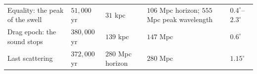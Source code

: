 \documentclass[
  11pt,
]{article}
\begin{document}
\begin{longtable}[]{@{}lllll@{}}
\begin{minipage}[t]{0.17\columnwidth}\raggedright
Equality: the peak of the swell\strut
\end{minipage} & \begin{minipage}[t]{0.17\columnwidth}\raggedright
\(51{,}000\) yr\strut
\end{minipage} & \begin{minipage}[t]{0.17\columnwidth}\raggedright
\(31\) kpc\strut
\end{minipage} & \begin{minipage}[t]{0.17\columnwidth}\raggedright
\(106\) Mpc horizon; \(555\) Mpc peak wavelength\strut
\end{minipage} & \begin{minipage}[t]{0.17\columnwidth}\raggedright
\(0.4^\circ\)--\(2.3^\circ\)\strut
\end{minipage}\tabularnewline
\begin{minipage}[t]{0.17\columnwidth}\raggedright
Drag epoch: the sound stops\strut
\end{minipage} & \begin{minipage}[t]{0.17\columnwidth}\raggedright
\(380{,}000\) yr\strut
\end{minipage} & \begin{minipage}[t]{0.17\columnwidth}\raggedright
\(139\) kpc\strut
\end{minipage} & \begin{minipage}[t]{0.17\columnwidth}\raggedright
\(147\) Mpc\strut
\end{minipage} & \begin{minipage}[t]{0.17\columnwidth}\raggedright
\(0.6^\circ\)\strut
\end{minipage}\tabularnewline
\begin{minipage}[t]{0.17\columnwidth}\raggedright
Last scattering\strut
\end{minipage} & \begin{minipage}[t]{0.17\columnwidth}\raggedright
\(372{,}000\) yr\strut
\end{minipage} & \begin{minipage}[t]{0.17\columnwidth}\raggedright
\(280\) Mpc horizon\strut
\end{minipage} & \begin{minipage}[t]{0.17\columnwidth}\raggedright
\(280\) Mpc\strut
\end{minipage} & \begin{minipage}[t]{0.17\columnwidth}\raggedright
\(1.15^\circ\)\strut
\end{minipage}\tabularnewline

\end{longtable}
\end{document}
